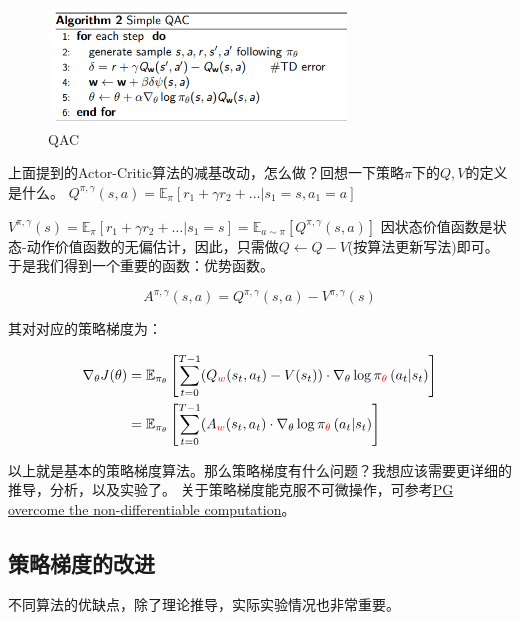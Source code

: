 \documentclass[UTF8]{ctexart}
\begin{document}
\begin{figure}[htbp]
	\centering
	\includegraphics[width=8cm, height=3.1cm]{./pic/QAC.png}
    \caption{QAC}
    \label{QAC}
\end{figure}

上面提到的Actor-Critic算法的减基改动，怎么做？回想一下策略$\pi$下的$Q,V$的定义是什么。
$Q^{\pi, \gamma}(s, a)=\mathbb{E}_{\pi}\left[r_{1}+\gamma r_{2}+\ldots | s_{1}=s, a_{1}=a\right]$

$V^{\pi, \gamma}(s)=\mathbb{E}_{\pi}\left[r_{1}+\gamma r_{2}+\ldots | s_{1}=s\right]=\mathbb{E}_{a \sim \pi}[Q^{\pi, \gamma}(s,a)]$
因状态价值函数是状态-动作价值函数的无偏估计，因此，只需做$Q \leftarrow Q -V$(按算法更新写法)即可。
于是我们得到一个重要的函数：优势函数。
\begin{definition}
    $$A^{\pi, \gamma}(s, a) = Q^{\pi, \gamma}(s, a) - V^{\pi, \gamma}(s) $$
\end{definition}

其对对应的策略梯度为：

\begin{equation} \label{JAC}  \begin{aligned}\nabla_{\theta} J(\theta)&=\mathbb{E}_{\pi_{\theta}}\left[\sum_{t=0}^{T-1} (Q_{{\color{red} w}}(s_t, a_t) - V(s_t))
\cdot \nabla_{\theta} \log \pi_{{\color{red} \theta}}\left(a_{t} | s_{t}\right)\right] \\
&= \mathbb{E}_{\pi_{\theta}}\left[\sum_{t=0}^{T-1} (A_{{\color{red} w}}(s_t, a_t)
\cdot \nabla_{\theta} \log \pi_{{\color{red} \theta}}\left(a_{t} | s_{t}\right)\right] \end{aligned}
\end{equation}

以上就是基本的策略梯度算法。那么策略梯度有什么问题？我想应该需要更详细的推导，分析，以及实验了。
关于策略梯度能克服不可微操作，可参考\href{http://karpathy.github.io/2016/05/31/rl/}{PG overcome the non-differentiable computation}。

\subsection{策略梯度的改进}
不同算法的优缺点，除了理论推导，实际实验情况也非常重要。
\end{document}
